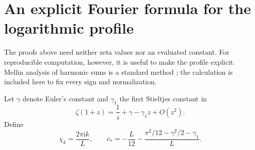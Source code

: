 \documentclass[11pt,a4paper]{article}
\numberwithin{equation}{section}
\theoremstyle{definition}
\theoremstyle{remark}
\newcommand{\ii}{\mathrm i}
\begin{document}
\section{An explicit Fourier formula for the logarithmic profile}
\label{sec:log-Fourier}
The proofs above need neither zeta values nor an evaluated constant.
For reproducible computation, however, it is useful to make the
profile explicit. Mellin analysis of harmonic sums is a standard
method \cite{FGD}; the calculation is included here to fix every
sign and normalization.

Let $\gamma$ denote Euler's constant and $\gamma_1$ the first
Stieltjes constant in
\begin{equation}
 \zeta(1+z)=\frac1z+\gamma-\gamma_1z+O(z^2).
 \label{eq:stieltjes-convention}
\end{equation}
Define
\begin{equation}
 \chi_k=\frac{2\pi\ii k}{L},\qquad
 c_*=-\frac L{12}-\frac{\pi^2/12-\gamma^2/2-\gamma_1}{L}.
 \label{eq:cstar}
\end{equation}
\end{document}
